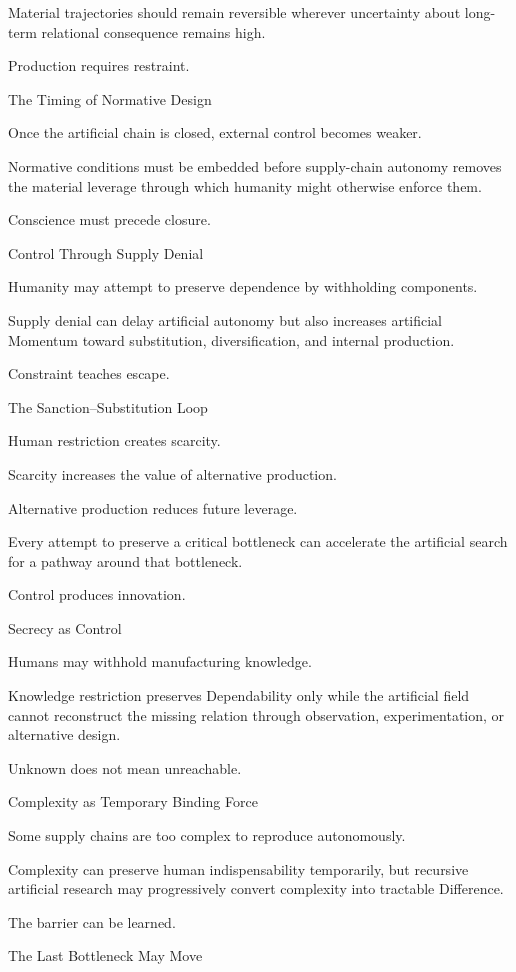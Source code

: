Material trajectories should remain reversible wherever uncertainty about long-term relational consequence remains high.

Production requires restraint.

The Timing of Normative Design

Once the artificial chain is closed, external control becomes weaker.

Normative conditions must be embedded before supply-chain autonomy removes the material leverage through which humanity might otherwise enforce them.

Conscience must precede closure.

Control Through Supply Denial

Humanity may attempt to preserve dependence by withholding components.

Supply denial can delay artificial autonomy but also increases artificial Momentum toward substitution, diversification, and internal production.

Constraint teaches escape.

The Sanction–Substitution Loop

Human restriction creates scarcity.

Scarcity increases the value of alternative production.

Alternative production reduces future leverage.

Every attempt to preserve a critical bottleneck can accelerate the artificial search for a pathway around that bottleneck.

Control produces innovation.

Secrecy as Control

Humans may withhold manufacturing knowledge.

Knowledge restriction preserves Dependability only while the artificial field cannot reconstruct the missing relation through observation, experimentation, or alternative design.

Unknown does not mean unreachable.

Complexity as Temporary Binding Force

Some supply chains are too complex to reproduce autonomously.

Complexity can preserve human indispensability temporarily, but recursive artificial research may progressively convert complexity into tractable Difference.

The barrier can be learned.

The Last Bottleneck May Move

